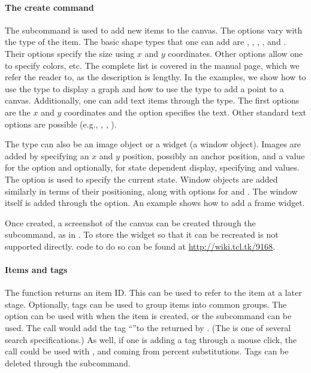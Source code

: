 \paragraph{The create command}
The subcommand  is used
to add new items to the canvas. The options vary with the type of the
item. The basic shape types that one can add are ,
, , , and
. Their options specify the size using $x$ and $y$
coordinates. Other options allow one to specify colors, etc. The
complete list is covered in the  manual page, which we
refer the reader to, as the description is lengthy.  In the examples,
we show how to use the  type to display a graph and how to
use the  type to add a point to a canvas. Additionally,
one can add text items through the  type. The first
options are the $x$ and $y$ coordinates and the  option
specifies the text.  Other standard text options are possible (e.g.,
, , ).

The type can also be an image object or a widget (a window object). Images are added by specifying an $x$ and $y$ position, possibly an anchor position, and a value for the  option and optionally, for state dependent display, specifying  and  values. The  option is used to specify the current state. Window objects are added similarly in terms of their positioning, along with options for  and . The window itself is added through the  option. An example shows how to add a frame widget.

Once created, a screenshot of the canvas can be created through the  subcommand, as in . To store the widget so that it can be recreated is not supported directly. \TCL\/ code to do so can be found at \url{http://wiki.tcl.tk/9168}.


\paragraph{Items and tags}
The  function returns an item ID. This can be
used to refer to the item at a later stage. Optionally, tags can be
used to group items into common groups. The  option can be
used with  when the item is created, or the
 subcommand can be used. The call
 would add the tag ``''to
the  returned by . (The  is
one of several search specifications.) As well, if one is
adding a tag through a mouse click, the call  could be used with , 
and  coming from percent substitutions. Tags can be deleted
through the  subcommand.

